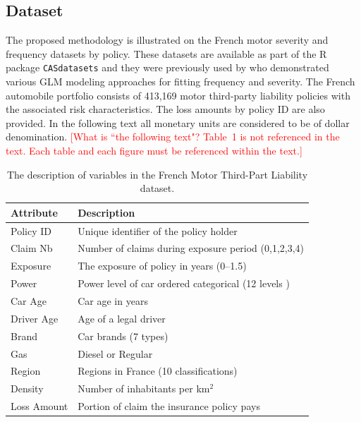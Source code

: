 \documentclass[11pt,letterpaper]{article}
\numberwithin{equation}{section}
\numberwithin{equation}{section}
\numberwithin{equation}{section}
\begin{document}
\subsection{Dataset}
The proposed methodology is illustrated on the French motor severity and frequency datasets by policy. These datasets are available as part of the {\sf R} package {\tt CASdatasets} \citep{Dutang+Charpentier:2016} and they were previously used by \cite{Charpentier:2014} who demonstrated various GLM modeling approaches for fitting frequency and severity. The French automobile portfolio consists of 413,169 motor third-party liability policies with the associated risk characteristics. The loss amounts by policy ID are also provided. In the following text all monetary units are considered to be of dollar denomination. \textcolor{red}{[What is ``the following text"? Table~1 is not referenced in the text. Each table and each figure must be referenced within the text.]}
\begin{small}
\begin{table}[!htb]
\begin{center}
    \caption{The description of variables in the French Motor Third-Part Liability dataset.}
      \centering
        \begin{tabular}{ll}
\hline
Attribute & Description \\
\hline
Policy ID & Unique identifier of the policy holder\\
Claim Nb & Number of claims during exposure period  (0,1,2,3,4)\\
Exposure & The exposure of policy in years (0--1.5) \\
Power & Power level of car ordered categorical (12 levels )\\
Car Age & Car age in years \\
Driver Age & Age of a legal driver \\
Brand & Car brands (7 types) \\
Gas & Diesel or Regular \\
Region & Regions in France (10 classifications)\\
Density & Number of inhabitants per km$^2$ \\
Loss Amount & Portion of claim the insurance policy pays\\
\hline
		\end{tabular}
\end{center}
\end{table}
\end{small}
\end{document}
